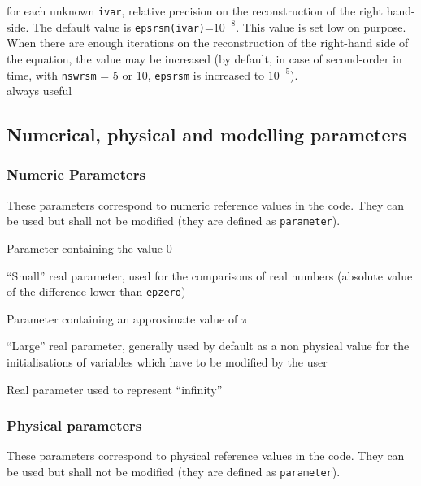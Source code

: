 {for each unknown {\tt ivar}, relative precision on the reconstruction of the
right hand-side. The default value is {\tt epsrsm(ivar)}=$10^{-8}$. This value is set low
on purpose. When there are enough iterations on the reconstruction of the
right-hand side of the equation,
the value may be increased (by default, in case of second-order in time,
with {\tt nswrsm} = 5 or 10, {\tt epsrsm} is increased to $10^{-5}$).\\
always useful}


\subsection{Numerical, physical and modelling parameters}
\subsubsection{Numeric Parameters}

These parameters correspond to numeric reference values in the code.
They can be used but shall not be modified (they are defined as \texttt{parameter}).

{Parameter containing the value 0}

{``Small'' real parameter, used for the comparisons of real numbers (absolute
value of the difference lower than {\tt epzero})}

{Parameter containing an approximate value of $\pi$}

{``Large'' real parameter, generally used by default as a non physical value for
the initialisations of variables which have to be modified by the user}

{Real parameter used to represent ``infinity''}

\subsubsection{Physical parameters}
These parameters correspond to physical reference values in the code.
They can be used but shall not be modified (they are defined as {\tt parameter}).

